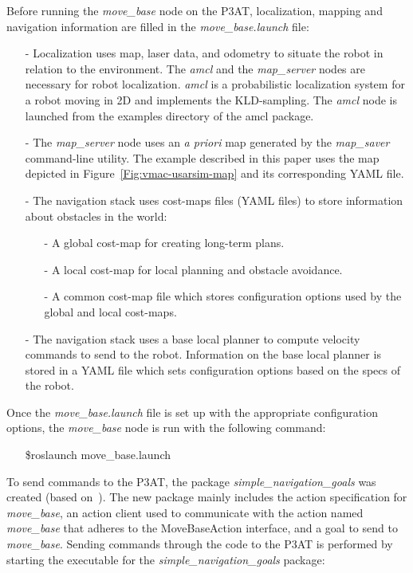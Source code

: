 Before running the {\it move\_base} node on the P3AT, localization, mapping and navigation information are filled in the {\it move\_base.launch} file:
\begin{itemize}
 \item [-] Localization uses map, laser data, and odometry to situate the robot in relation to the environment. The {\it amcl} and the {\it map\_server} nodes are necessary for robot localization. {\it amcl} is a probabilistic localization system for a robot moving in 2D and implements the KLD-sampling\cite{DIETER.IJRS.2003}. The {\it amcl} node is launched from the examples directory of the amcl package.
\item [-] The {\it map\_server} node uses an {\it a priori} map generated by the {\it map\_saver} command-line utility. The example described in this paper uses the map depicted in Figure~\ref{Fig:vmac-usarsim-map} and its corresponding YAML file.
\item [-] The navigation stack uses cost-maps files (YAML files) to store information about obstacles in the world:
\begin{itemize}
\item [-] A global cost-map for creating long-term plans.
\item [-] A local cost-map for local planning and obstacle avoidance.
\item [-] A common cost-map file which stores configuration options used by the global and local cost-maps.
\end{itemize}
\item [-] The navigation stack uses a base local planner to compute velocity commands to send to the robot. Information on the base local planner is stored in a YAML file which sets configuration options based on the specs of the robot.
\end{itemize}

Once the {\it move\_base.launch} file is set up with the appropriate configuration options, the {\it move\_base} node is run with the following command:

\begin{itemize}
\item[]\$roslaunch move\_base.launch
\end{itemize}

To send commands to the P3AT, the package {\it simple\_navigation\_goals} was created (based on~\cite{SendingSimpleGoals}). The new package mainly includes the action specification for {\it move\_base}, an action client used to communicate with the action named {\it move\_base} that adheres to the MoveBaseAction interface, and a goal to send to {\it move\_base}. Sending commands through the code to the P3AT is performed by starting the executable for the {\it simple\_navigation\_goals} package:

